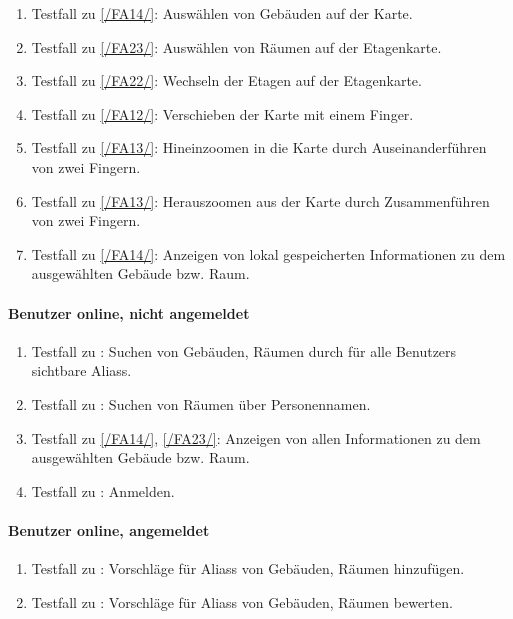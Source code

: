 \begin{enumerate}[label=\textbf{/T\arabic*0/}, align=left]
	\item \label{/T130/} Testfall zu \ref{/FA14/}: Auswählen von Gebäuden auf der \Gls{Karte}.
	\item \label{/T140/} Testfall zu \ref{/FA23/}: Auswählen von Räumen auf der \Gls{Etagenkarte}.
	\item \label{/T150/} Testfall zu \ref{/FA22/}: Wechseln der Etagen auf der \Gls{Etagenkarte}.
	\item \label{/T160/} Testfall zu \ref{/FA12/}: Verschieben der \Gls{Karte} mit einem Finger.
	\item \label{/T170/} Testfall zu \ref{/FA13/}: Hineinzoomen in die \Gls{Karte} durch Auseinanderführen von zwei Fingern.
	\item \label{/T180/} Testfall zu \ref{/FA13/}: Herauszoomen aus der \Gls{Karte} durch Zusammenführen von zwei Fingern.
	\item \label{/T190/} Testfall zu \ref{/FA14/}: Anzeigen von \gls{lokal} gespeicherten Informationen zu dem ausgewählten Gebäude bzw. Raum.
\end{enumerate}

\paragraph{\Gls{Benutzer} online, nicht angemeldet}
\begin{enumerate}[label=\textbf{/T\arabic*0/}, align=left, resume]
	\item \label{/T200/} Testfall zu : Suchen von Gebäuden, Räumen durch für alle \Glspl{Benutzer} sichtbare \Glspl{Alias}.
	\item \label{/T210/} Testfall zu : Suchen von Räumen über Personennamen.
	\item \label{/T220/} Testfall zu \ref{/FA14/}, \ref{/FA23/}: Anzeigen von allen Informationen zu dem ausgewählten Gebäude bzw. Raum.
	\item \label{/T230/} Testfall zu : Anmelden.
\end{enumerate}

\paragraph{\Gls{Benutzer} online, angemeldet}
\begin{enumerate}[label=\textbf{/T\arabic*0/}, align=left, resume]
	\item \label{/T240/} Testfall zu : Vorschläge für \Glspl{Alias} von Gebäuden, Räumen hinzufügen.
	\item \label{/T250/} Testfall zu : Vorschläge für \Glspl{Alias} von Gebäuden, Räumen bewerten.
\end{enumerate}

